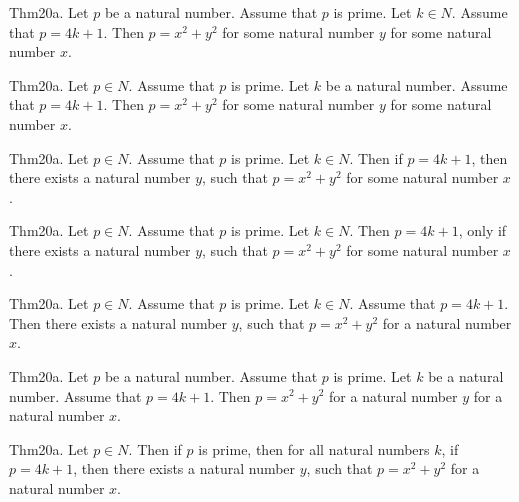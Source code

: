 \documentclass{article}
\begin{document}
Thm20a. Let $p$ be a natural number. Assume that $p$ is prime. Let $k \in N$. Assume that $p = 4 k + 1$. Then $p = x ^{ 2}+ y ^{ 2}$ for some natural number $y$ for some natural number $x$.

Thm20a. Let $p \in N$. Assume that $p$ is prime. Let $k$ be a natural number. Assume that $p = 4 k + 1$. Then $p = x ^{ 2}+ y ^{ 2}$ for some natural number $y$ for some natural number $x$.

Thm20a. Let $p \in N$. Assume that $p$ is prime. Let $k \in N$. Then if $p = 4 k + 1$, then there exists a natural number $y$, such that $p = x ^{ 2}+ y ^{ 2}$ for some natural number $x$.

Thm20a. Let $p \in N$. Assume that $p$ is prime. Let $k \in N$. Then $p = 4 k + 1$, only if there exists a natural number $y$, such that $p = x ^{ 2}+ y ^{ 2}$ for some natural number $x$.

Thm20a. Let $p \in N$. Assume that $p$ is prime. Let $k \in N$. Assume that $p = 4 k + 1$. Then there exists a natural number $y$, such that $p = x ^{ 2}+ y ^{ 2}$ for a natural number $x$.

Thm20a. Let $p$ be a natural number. Assume that $p$ is prime. Let $k$ be a natural number. Assume that $p = 4 k + 1$. Then $p = x ^{ 2}+ y ^{ 2}$ for a natural number $y$ for a natural number $x$.

Thm20a. Let $p \in N$. Then if $p$ is prime, then for all natural numbers $k$, if $p = 4 k + 1$, then there exists a natural number $y$, such that $p = x ^{ 2}+ y ^{ 2}$ for a natural number $x$.
\end{document}
